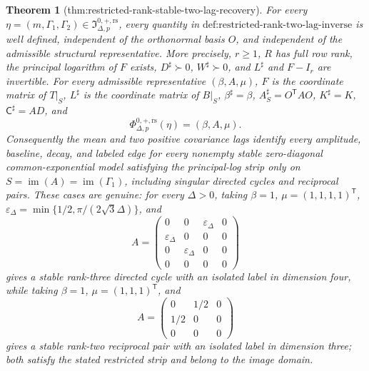 \documentclass{article}
\newtheorem{theorem}{Theorem}
\begin{document}
\begin{theorem}[thm:restricted-rank-stable-two-lag-recovery]\label{thm:restricted-rank-stable-two-lag-recovery}
For every \(\eta=(m,\Gamma_1,\Gamma_2)\in\mathfrak I_{\Delta,p}^{0,+,\mathrm{rs}}\), every quantity in \(\text{def:restricted-rank-two-lag-inverse}\) is well defined, independent of the orthonormal basis \(O\), and independent of the admissible structural representative.  More precisely, \(r\geq1\), \(R\) has full row rank, the principal logarithm of \(F\) exists, \(D^\sharp\succ0\), \(W^\sharp\succ0\), and \(L^\sharp\) and \(F-I_r\) are invertible.  For every admissible representative \((\beta,A,\mu)\), \(F\) is the coordinate matrix of \(T|_S\), \(L^\sharp\) is the coordinate matrix of \(B|_S\), \(\beta^\sharp=\beta\), \(A_S^\sharp=O^{\mathsf T}AO\), \(K^\sharp=K\), \(\mathsf C^\sharp=AD\), and
\[
 \Phi_{\Delta,p}^{0,+,\mathrm{rs}}(\eta)=(\beta,A,\mu).
\]
Consequently the mean and two positive covariance lags identify every amplitude, baseline, decay, and labeled edge for every nonempty stable zero-diagonal common-exponential model satisfying the principal-log strip only on \(S=\operatorname{im}(A)=\operatorname{im}(\Gamma_1)\), including singular directed cycles and reciprocal pairs.  These cases are genuine: for every \(\Delta>0\), taking \(\beta=1\), \(\mu=(1,1,1,1)^{\mathsf T}\), \(\varepsilon_\Delta=\min\{1/2,\pi/(2\sqrt3\Delta)\}\), and
\[
 A=\begin{pmatrix}
 0&0&\varepsilon_\Delta&0\\
 \varepsilon_\Delta&0&0&0\\
 0&\varepsilon_\Delta&0&0\\
 0&0&0&0
 \end{pmatrix}
\]
gives a stable rank-three directed cycle with an isolated label in dimension four, while taking \(\beta=1\), \(\mu=(1,1,1)^{\mathsf T}\), and
\[
 A=\begin{pmatrix}0&1/2&0\\1/2&0&0\\0&0&0\end{pmatrix}
\]
gives a stable rank-two reciprocal pair with an isolated label in dimension three; both satisfy the stated restricted strip and belong to the image domain.
\end{theorem}
\end{document}
